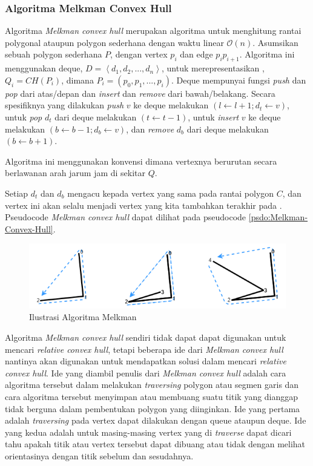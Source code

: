 \subsubsection{ Algoritma Melkman Convex Hull}
\label{sec:algoritma-melkman-convex-hull}
Algoritma \textit{Melkman convex hull} merupakan algoritma untuk menghitung rantai polygonal ataupun polygon sederhana dengan waktu linear $\mathcal{O}(n)$\cite{melkman_algorithm}. Asumsikan sebuah polygon sederhana $P$, dengan vertex $p_i$ dan edge $p_i p_{i+1}$. Algoritma ini menggunakan deque, $D = \left \langle d_1, d_2, ..., d_n \right \rangle$, untuk merepresentasikan \CH, $Q_i = CH(P_i)$, dimana $P_i = (p_0, p_1, ..., p_i)$. Deque mempunyai fungsi \textit{push} dan \textit{pop} dari atas/depan dan \textit{insert} dan \textit{remove} dari bawah/belakang. Secara spesifiknya yang dilakukan \textit{push} $v$ ke deque melakukan $(l \leftarrow l+1; d_t \leftarrow v)$, untuk \textit{pop} $d_t$ dari deque melakukan $(t \leftarrow t-1)$, untuk \textit{insert} $v$ ke deque melakukan $(b \leftarrow b-1; d_b \leftarrow v)$, dan \textit{remove} $d_b$ dari deque melakukan $(b \leftarrow b+1)$.
\par Algoritma ini menggunakan konvensi dimana vertexnya berurutan secara berlawanan arah jarum jam di sekitar \CH $Q$.
\par Setiap $d_t$ dan $d_b$ mengacu kepada vertex yang sama pada rantai polygon $C$, dan vertex ini akan selalu menjadi vertex yang kita tambahkan terakhir pada \CH. Pseudocode \textit{Melkman convex hull} dapat dilihat pada pseudocode \ref{psdo:Melkman-Convex-Hull}.
\begin{figure}[!h]
	\Centering
	\includegraphics [width=\columnwidth]{bab2/img/ilustrasi-algoritma-melkman}
	\caption {Ilustrasi Algoritma Melkman}
	\label {fig:ilustrasi-algoritma-melkman}
\end{figure}
\par Algoritma \textit{Melkman convex hull} sendiri tidak dapat dapat digunakan untuk mencari \textit{relative convex hull}, tetapi beberapa ide dari \textit{Melkman convex hull} nantinya akan digunakan untuk mendapatkan solusi dalam mencari \textit{relative convex hull}. Ide yang diambil penulis dari \textit{Melkman convex hull} adalah cara algoritma tersebut dalam melakukan \textit{traversing} polygon atau segmen garis dan cara algoritma tersebut menyimpan atau membuang suatu titik yang dianggap tidak berguna dalam pembentukan polygon yang diinginkan. Ide yang pertama adalah \textit{traversing} pada vertex dapat dilakukan dengan queue ataupun deque. Ide yang kedua adalah untuk masing-masing vertex yang di \textit{traverse} dapat dicari tahu apakah titik atau vertex tersebut dapat dibuang atau tidak dengan melihat orientasinya dengan titik sebelum dan sesudahnya.
